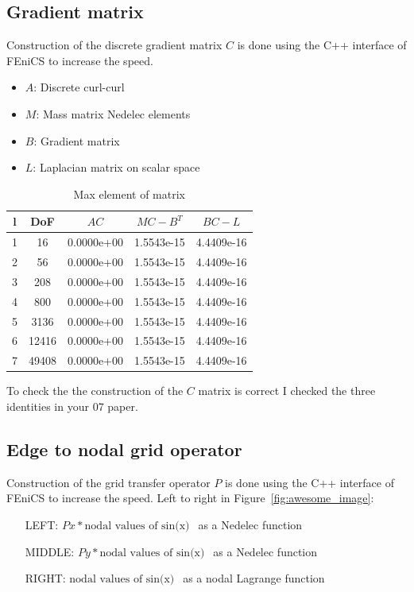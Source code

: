 \documentclass{article}
\begin{document}
\subsection*{Gradient matrix}

Construction of the discrete gradient matrix $C$ is done using the C++ interface of FEniCS to increase the speed.

\begin{itemize}
    \item $A$: Discrete curl-curl
    \item $M$: Mass matrix Nedelec elements
    \item $B$: Gradient matrix
    \item $L$: Laplacian matrix on scalar space
\end{itemize}


\begin{table}[h!]
\centering
    \begin{tabular}{ccccc}
    \hline
      l &  DoF &        $AC$ &    $MC-B^T$ &      $BC-L$ \\
    \hline
      1 &     16 &  0.0000e+00 &  1.5543e-15 &  4.4409e-16 \\
      2 &     56 &  0.0000e+00 &  1.5543e-15 &  4.4409e-16 \\
      3 &    208 &  0.0000e+00 &  1.5543e-15 &  4.4409e-16 \\
      4 &    800 &  0.0000e+00 &  1.5543e-15 &  4.4409e-16 \\
      5 &   3136 &  0.0000e+00 &  1.5543e-15 &  4.4409e-16 \\
      6 &  12416 &  0.0000e+00 &  1.5543e-15 &  4.4409e-16 \\
      7 &  49408 &  0.0000e+00 &  1.5543e-15 &  4.4409e-16 \\
    \hline
    \end{tabular}
    \caption{Max element of matrix}
    \label{tab:awesome_image}
\end{table}

To check the the construction of the $C$ matrix is correct I checked the three identities in your 07 paper.



\subsection*{Edge to nodal grid operator}

Construction of the grid transfer operator $P$ is done using the C++ interface of FEniCS to increase the speed. Left to right in Figure~\ref{fig:awesome_image}:
\begin{itemize}
    \item[LEFT: ] $Px*\mbox{nodal values of sin(x}) \ \ $  as a Nedelec function
    \item[MIDDLE: ] $Py*\mbox{nodal values of sin(x}) \ \ $ as a Nedelec function
    \item[RIGHT: ] $\mbox{nodal values of sin(x}) \ \ $ as a nodal Lagrange function
\end{itemize}
\end{document}
